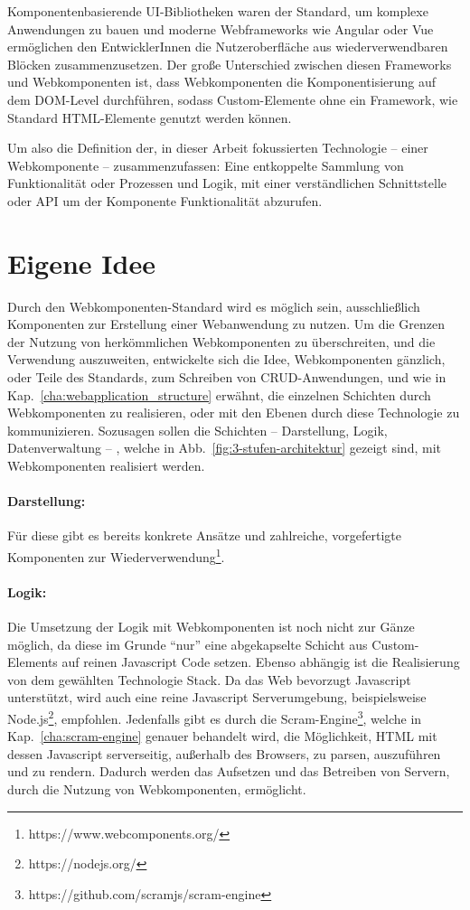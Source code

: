 Komponentenbasierende UI-Bibliotheken waren der Standard, um komplexe Anwendungen zu bauen und moderne Webframeworks wie Angular oder Vue ermöglichen den EntwicklerInnen die Nutzeroberfläche aus wiederverwendbaren Blöcken zusammenzusetzen. Der große Unterschied zwischen diesen Frameworks und Webkomponenten ist, dass Webkomponenten die Komponentisierung auf dem DOM-Level durchführen, sodass Custom-Elemente ohne ein Framework, wie Standard HTML-Elemente genutzt werden können. 

Um also die Definition der, in dieser Arbeit fokussierten Technologie -- einer Webkomponente -- zusammenzufassen: Eine entkoppelte Sammlung von Funktionalität oder Prozessen und Logik, mit einer verständlichen Schnittstelle oder API um der Komponente Funktionalität abzurufen.


\section{Eigene Idee}
Durch den Webkomponenten-Standard wird es möglich sein, ausschließlich Komponenten zur Erstellung einer Webanwendung zu nutzen. Um die Grenzen der Nutzung von herkömmlichen Webkomponenten zu überschreiten, und die Verwendung auszuweiten, entwickelte sich die Idee, Webkomponenten gänzlich, oder Teile des Standards, zum Schreiben von CRUD-Anwendungen, und wie in Kap.~\ref{cha:webapplication_structure} erwähnt, die einzelnen Schichten durch Webkomponenten zu realisieren, oder mit den Ebenen durch diese Technologie zu kommunizieren. Sozusagen sollen die Schichten -- Darstellung, Logik, Datenverwaltung -- , welche in Abb.~\ref{fig:3-stufen-architektur} gezeigt sind, mit Webkomponenten realisiert werden. 

\paragraph{Darstellung:}Für diese gibt es bereits konkrete Ansätze und zahlreiche, vorgefertigte Komponenten zur Wiederverwendung\footnote{https://www.webcomponents.org/}.

\paragraph{Logik: }Die Umsetzung der Logik mit Webkomponenten ist noch nicht zur Gänze möglich, da diese im Grunde "`nur"' eine abgekapselte Schicht aus Custom-Elements auf reinen Javascript Code setzen. Ebenso abhängig ist die Realisierung von dem gewählten Technologie Stack. Da das Web bevorzugt Javascript unterstützt, wird auch eine reine Javascript Serverumgebung, beispielsweise Node.js\footnote{https://nodejs.org/}, empfohlen. Jedenfalls gibt es durch die Scram-Engine\footnote{https://github.com/scramjs/scram-engine}, welche in Kap.~\ref{cha:scram-engine} genauer behandelt wird, die Möglichkeit, HTML mit dessen Javascript serverseitig, außerhalb des Browsers, zu parsen, auszuführen und zu rendern. Dadurch werden das Aufsetzen und das Betreiben von Servern, durch die Nutzung von Webkomponenten, ermöglicht.


